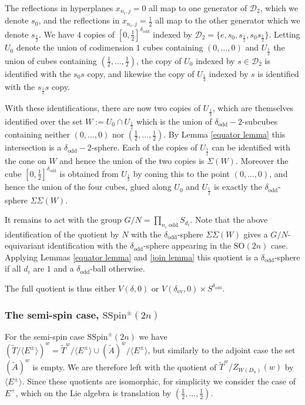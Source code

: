 \documentclass[11pt,a4paper]{article}
\def\SSpin{\mathrm{SSpin}}
\def\SO{\mathrm{SO}}
\def\D{\mathcal{D}}
\def\SSpin{\mathrm{SSpin}}
\def\Atilde{(\widetilde{A})}
\def\coveringtorus{\tilde{T}}
\def\ev{\mathrm{ev}}
\def\odd{\mathrm{odd}}
\begin{document}
The reflections in hyperplanes $x_{n_i,j}=0$ all map to one generator of $\D_2$, which we denote $s_0$, and the reflections in $x_{n_i,j}=\frac 12$ all map to the other generator which we denote $s_{\!\frac12}$. We have $4$ copies of $[0,\frac 12]^{\delta_\odd}$ indexed by $\D_2=\{e,s_0,s_{\!\frac12},s_0s_{\!\frac 12}\}$.
Letting $U_0$ denote the union of codimension $1$ cubes containing $(0,\dots,0)$ and $U_{\!\frac 12}$ the union of cubes containing $(\frac 12,\dots,\frac 12)$, the copy of $U_0$ indexed by $s\in \D_2$ is identified with the $s_0s$ copy, and likewise the copy of $U_{\!\frac12}$ indexed by $s$ is identified with the $s_{\!\frac 12}s$ copy.

With these identifications, there are now two copies of $U_{\!\frac12}$, which are themselves identified over the set $W:=U_0\cap U_{\!\frac12}$ which is the union of ${\delta_\odd}-2$-subcubes containing neither  $(0,\dots,0)$ nor $(\frac12,\dots,\frac12)$. By Lemma \ref{equator lemma} this intersection is a ${\delta_\odd}-2$-sphere. Each of the copies of $U_{\!\frac12}$ can be identified with the cone on $W$ and hence the union of the two copies is $\Sigma (W)$. Moreover the cube $[0,\frac 12]^{\delta_\odd}$ is obtained from $U_{\!\frac12}$ by coning this to the point $(0,\dots,0)$, and hence the union of the four cubes, glued along $U_0$ and $U_{\!\frac12}$ is exactly the ${\delta_\odd}$-sphere $\Sigma\Sigma(W)$.

It remains to act with the group $G/N=\prod\limits_{n_i\text{ odd}} S_{d_i}$. Note that the above identification of the quotient by $N$ with the ${\delta_\odd}$-sphere $\Sigma\Sigma(W)$ gives a $G/N$-equivariant identification with the ${\delta_\odd}$-sphere appearing in the $\SO(2n)$ case.  Applying Lemmas \ref{equator lemma} and \ref{join lemma} this quotient is a ${\delta_\odd}$-sphere if all $d_i$ are $1$ and a ${\delta_\odd}$-ball otherwise.

The full quotient is thus either $V(\delta,0)$ or $V(\delta_\ev,0)\times S^{\delta_\odd}$.






\subsubsection{The semi-spin case, $\SSpin^\pm(2n)$}
For the semi-spin case $\SSpin^\pm(2n)$ we have $(\coveringtorus/\langle E^\pm\rangle)^w=\coveringtorus^w/\langle E^\pm\rangle \cup \Atilde^w/\langle E^\pm\rangle$, but similarly to the adjoint case the set $\Atilde^w$ is empty. We are therefore left with the quotient of $\coveringtorus^w/Z_{W(D_n)}(w)$ by $\langle E^\pm \rangle$. Since these quotients are isomorphic, for simplicity we consider the case of $E^+$, which on the Lie algebra is translation by $(\frac 12,\dots,\frac 12)$.
\end{document}
